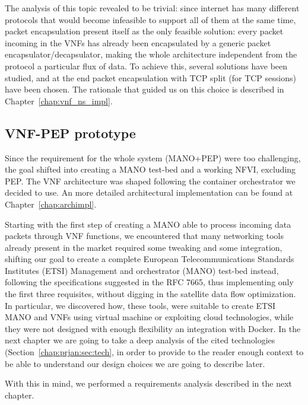 The analysis of this topic revealed to be trivial: since internet has many
different protocols that would become infeasible to support all of them at the
same time, packet encapsulation present itself as the only feasible solution:
every packet incoming in the VNFs has already been encapsulated by a generic
packet encapsulator/decapsulator,
 making the whole architecture 
independent from the protocol a particular flux of data. To achieve this, 
several solutions have been studied, and at the end packet encapsulation with 
TCP split (for TCP sessions) have been chosen. The rationale that guided us on 
this choice is described in Chapter~\ref{chap:vnf_ns_impl}. 

\subsection{VNF-PEP prototype}

Since the requirement for the whole system (MANO+PEP) were too challenging, the 
goal shifted into creating a MANO test-bed and a working NFVI, excluding PEP. 
The VNF architecture was shaped following the container orchestrator we decided 
to use. An more detailed architectural implementation can be found at 
Chapter~\ref{chap:archimpl}.


\vspace{0.5cm}

Starting with the first step of creating a MANO able to process incoming data
packets through VNF functions, we encountered that many networking tools already
present in the market required some tweaking and some integration, shifting our
goal to create a complete European Telecommunications Standards Institutes
(ETSI) Management and orchestrator (MANO) test-bed instead, following the
specifications suggested in the RFC 7665, thus implementing only the first three
requisites, without digging in the satellite data flow optimization. In
particular, we discovered how, these tools, were suitable to create ETSI MANO
and VNFs using virtual machine or exploiting cloud technologies, while they were
not designed with enough flexibility an integration with Docker. In the next
chapter we are going to take a deep analysis of the cited technologies 
(Section~\ref{chap:prjan:sec:tech}, in order to provide to the reader enough 
context to be able to understand our design choices we are going to describe 
later.

\noindent With this in mind, we performed a requirements analysis described in
the next chapter.
 
